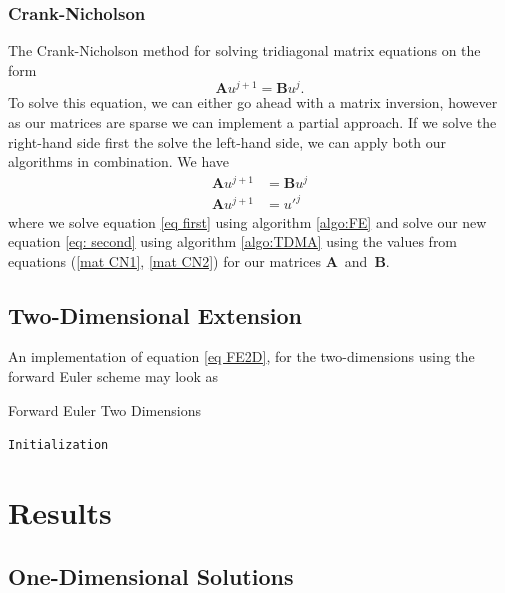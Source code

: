 \documentclass[%
reprint,
nofootinbib,
amsmath,amssymb,
aps,
]{revtex4-1}
\begin{document}
\subsubsection{Crank-Nicholson}
The Crank-Nicholson method for solving tridiagonal matrix equations on the form 
\begin{equation}
	\mathbf{A}u^{j+1} = \mathbf{B}u^j.
\end{equation}
To solve this equation, we can either go ahead with a matrix inversion, however as our matrices are sparse we can implement a partial approach. If we solve the right-hand side first the solve the left-hand side, we can apply both our algorithms in combination. We have 
\begin{align}
	\mathbf{A}u^{j+1} &= \mathbf{B}u^j\label{eq first}\\ 
	\mathbf{A}u^{j+1} &= u'^j \label{eq: second}
\end{align}
where we solve equation \eqref{eq first} using algorithm \ref{algo:FE} and solve our new equation \eqref{eq: second} using algorithm \ref{algo:TDMA} using the values from equations (\ref{mat CN1}, \ref{mat CN2}) for our matrices $\mathbf{A}$ and $\mathbf{B}$.

\subsection{Two-Dimensional Extension}
An implementation of equation \eqref{eq FE2D}, for the two-dimensions using the forward Euler scheme may look as
\begin{algorithm}[H]\label{algo:FE2D}
	\SetAlgoLined
	\caption{Forward Euler Two Dimensions}
	\texttt{Initialization}\\
\end{algorithm}



\section{Results} %
\subsection{One-Dimensional Solutions}
\end{document}
